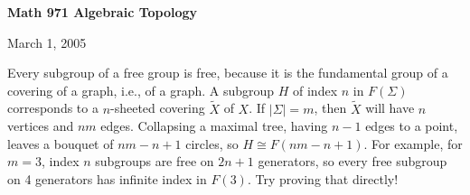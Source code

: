 \def\ccy{\Cyan}		  %
\def\cpb{\ProcessBlue}	  %
\def\csb{\SkyBlue}	  %
\def\ctu{\Turquoise}	  %
\def\ctb{\TealBlue}	  %
\def\caq{\Aquamarine}	  %
\def\cbg{\BlueGreen}	  %
\def\cem{\Emerald}	  %
\def\csg{\SeaGreen}	  %
\def\cgg{\Green}	  %
\def\cfg{\ForestGreen}	  %
\def\cpg{\PineGreen}	  %
\def\clg{\LimeGreen}	  %
\def\cyg{\YellowGreen}	  %
\def\cspg{\SpringGreen}	  %
\def\cog{\OliveGreen}	  %
\def\pars{\RawSienna}	  %
\def\cse{\Sepia}		  %
\def\cbr{\Brown}		  %
\def\cta{\Tan}		  %
\def\cgr{\Gray}		  %
\def\cbl{\Black}		  %
\def\cwh{\White}		  %


\loadmsbm



\def\ctln{\centerline}
\def\u{\underbar}
\def\ssk{\smallskip}
\def\msk{\medskip}
\def\bsk{\bigskip}
\def\hsk{\hskip.1in}
\def\hhsk{\hskip.2in}
\def\dsl{\displaystyle}
\def\hskp{\hskip1.5in}

\def\lra{$\Leftrightarrow$ }
\def\ra{\rightarrow}
\def\mpto{\logmapsto}
\def\pu{\pi_1}
\def\mpu{$\pi_1$}
\def\sig{\Sigma}
\def\msig{$\Sigma$}
\def\ep{\epsilon}
\def\sset{\subseteq}
\def\del{\partial}
\def\inv{^{-1}}
\def\wtl{\widetilde}
\def\lra{\Leftrightarrow}



\ctln{\bf Math 971 Algebraic Topology}

\ssk

\ctln{March 1, 2005}

\msk



Every
subgroup of a free group is free, because it is the fundamental group of a
covering of a graph, i.e., of a graph.
A subgroup $H$ of index $n$ in $F(\Sigma)$ corresponds to a $n$-sheeted covering $\wtl{X}$ of $X$. If
$|\Sigma| = m$, then $\wtl{X}$ will have $n$ vertices and $nm$ edges. Collapsing a maximal
tree, having $n-1$ edges to a point, leaves a bouquet of $nm-n+1$ circles, so $H\cong F(nm-n+1)$.
For example, for $m=3$, index $n$ subgroups are free on $2n+1$ generators, so every free subgroup
on 4 generators has infinite index in $F(3)$. Try proving that directly!

